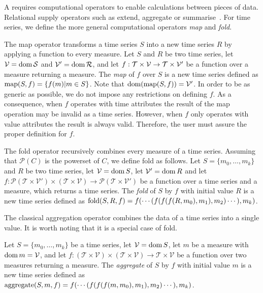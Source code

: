 A  requires computational operators to enable calculations
between pieces of data. Relational  supply operators such
as extend, aggregate or summarise~\cite{date:introduction}. For time
series, we define the more general computational operators \emph{map}
and \emph{fold}.

The map operator transforms a time series $S$ into a new time series
$R$ by applying a function to every measure.  Let $S$ and $R$ be two
time series, let $\cal{V}=\operatorname{dom} S$ and $\cal{V'}=\operatorname{dom} R$, and let
$f:\cal{T}\times\cal{V}\rightarrow\cal{T}\times\cal{V'}$ be a function
over a measure returning a measure. The \emph{map} of $f$ over $S$ is
a new time series defined as $\operatorname*{map}(S,f)=\{f(m)|m\in S\}$. Note that
$\operatorname{dom}(\operatorname*{map}(S,f))=\cal{V'}$. 
In order to be as generic as possible, we do not impose any
restrictions on defining $f$. As a consequence, when $f$ operates with
time attributes the result of the map operation may be invalid as a
time series. However, when $f$ only operates with value attributes the
result is always valid. Therefore, the user must assure the proper
definition for $f$.



The fold operator recursively combines every measure of a time
series. Assuming that $\mathcal{P}(C)$ is the powerset of $C$, we
define fold as follows.
%
Let $S=\{m_0,\dots, m_k\}$ and $R$ be two time series, let
$\mathcal{V}=\operatorname{dom} S$, let $\mathcal{V'}=\operatorname{dom} R$ and let
%
$f:\mathcal{P}(\mathcal{T}\times\mathcal{V'}) \times
(\mathcal{T}\times\mathcal{V}) \rightarrow
\mathcal{P}(\mathcal{T}\times\mathcal{V'})$
%
be a function over a time series and a measure, which returns a time
series.
%
The \emph{fold} of $S$ by $f$ with initial value $R$ is a new time
series defined as $\operatorname*{fold}(S,R,f) = f(\cdots(f(f(f(R,m_0),\allowbreak
m_1),\allowbreak m_2)\cdots),\allowbreak m_k)$.


The classical aggregation operator combines the data of a time series
into a single value.  It is worth noting that it is a special case of
fold.

Let $S=\{m_0,\dots,m_k\}$ be a time series, let $\mathcal{V}=\operatorname{dom} S$,
let $m$ be a measure with $\operatorname{dom} m=\mathcal{V}$, and let
$f:(\mathcal{T}\times\mathcal{V})\times(\mathcal{T}\times\mathcal{V})\rightarrow
\mathcal{T}\times\mathcal{V}$ be a function over two measures
returning a measure. The \emph{aggregate} of $S$ by $f$ with initial
value $m$ is a new time series defined as $\operatorname*{aggregate}(S,m,f) =
f(\cdots(f(f(f(m,m_0),\allowbreak m_1),\allowbreak
m_2)\cdots),\allowbreak m_k)$.


